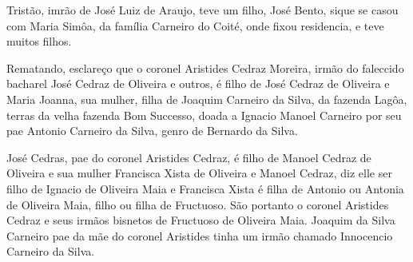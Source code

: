 Tristão, imrão de José Luiz de Araujo, teve um filho, José Bento, sique se casou com Maria Simôa, da família Carneiro do Coité, onde fixou residencia, e teve muitos filhos.

Rematando, esclareço que o coronel Aristides Cedraz Moreira, irmão do faleccido bacharel José Cedraz de Oliveira e outros, é filho de José Cedraz de Oliveira e Maria Joanna, sua mulher, filha de Joaquim Carneiro da Silva, da fazenda Lagôa, terras da velha fazenda Bom Successo, doada a Ignacio Manoel Carneiro por seu pae Antonio Carneiro da Silva, genro de Bernardo da Silva.

José Cedras, pae do coronel Aristides Cedraz, é filho de Manoel Cedraz de Oliveira e sua mulher Francisca Xista de Oliveira e Manoel Cedraz, diz elle ser filho de Ignacio de Oliveira Maia e Francisca  Xista é filha de Antonio ou Antonia de Oliveira Maia, filho ou filha de Fructuoso. São portanto o coronel Aristides Cedraz e seus irmãos bisnetos de Fructuoso de Oliveira Maia. Joaquim da Silva Carneiro pae da mãe do coronel Aristides tinha um irmão chamado Innocencio Carneiro da Silva.
